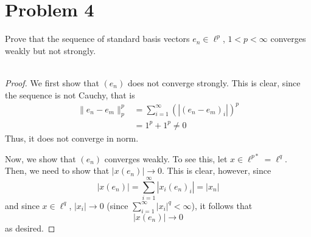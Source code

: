 \documentclass[fontsize=11pt]{scrartcl} %
\numberwithin{equation}{section} %
\numberwithin{figure}{section} %
\numberwithin{table}{section} %
\begin{document}
\section*{Problem 4}
Prove that the sequence of standard basis vectors $e_n\in \ell^p$, $1<p<\infty$
converges weakly but not strongly.
\\
\\
\begin{proof}
    We first show that $(e_n)$ does not converge strongly. This is clear, since
    the sequence is not Cauchy, that is
    \[
        \begin{aligned}
            \|e_n-e_m\|^p_p &= \sum_{i=1}^{\infty}(|(e_n-e_m)_i|)^p\\
                            &= 1^p+1^p\neq 0
        \end{aligned}
    \]
    Thus, it does not converge in norm.

    Now, we show that $(e_n)$ converges weakly. To see this, let $x\in \ell^{p*}
    = \ell^q$. Then, we need to show that $|x(e_n)|\to 0$. This is clear,
    however, since
    \[
        |x(e_n)| = \sum_{i=1}^{\infty}|x_i(e_n)_i| = |x_n|
    \]
    and since $x\in\ell^q$, $|x_i|\to 0$ (since $\sum_{i=1}^{\infty}|x_i|^q <
    \infty$), it follows that
    \[
        |x(e_n)|\to 0
    \]
    as desired.
\end{proof}
\end{document}

